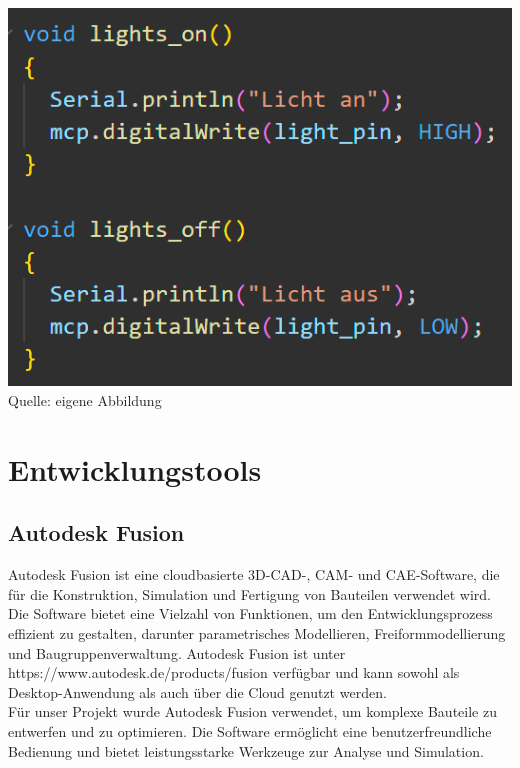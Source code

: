 \documentclass[ngerman,12pt,a4paper]{article}
\begin{document}
		\begin{center}
			\begin{minipage}{0.8\textwidth}
				\centering
				\includegraphics[width=\textwidth]{Pictures/code_licht_schalten}
				\label{fig:code_licht_schalten}
				\vspace{-3pt}
				{\small Quelle: {eigene Abbildung}}
				\vspace{0.5cm}
			\end{minipage}
		\end{center}
		
	\newpage
	\section{Entwicklungstools}
	
	 \subsection{Autodesk Fusion}

	 Autodesk Fusion ist eine cloudbasierte 3D-CAD-, CAM- und CAE-Software, die für die Konstruktion, Simulation und Fertigung von Bauteilen verwendet wird. Die Software bietet eine Vielzahl von Funktionen, um den Entwicklungsprozess effizient zu gestalten, darunter parametrisches Modellieren, Freiformmodellierung und Baugruppenverwaltung. Autodesk Fusion ist unter https://www.autodesk.de/products/fusion verfügbar und kann sowohl als Desktop-Anwendung als auch über die Cloud genutzt werden. \\[0.5cm]
	 Für unser Projekt wurde Autodesk Fusion verwendet, um komplexe Bauteile zu entwerfen und zu optimieren. Die Software ermöglicht eine benutzerfreundliche Bedienung und bietet leistungsstarke Werkzeuge zur Analyse und Simulation. \\[0.5cm]
	 
\end{document}
